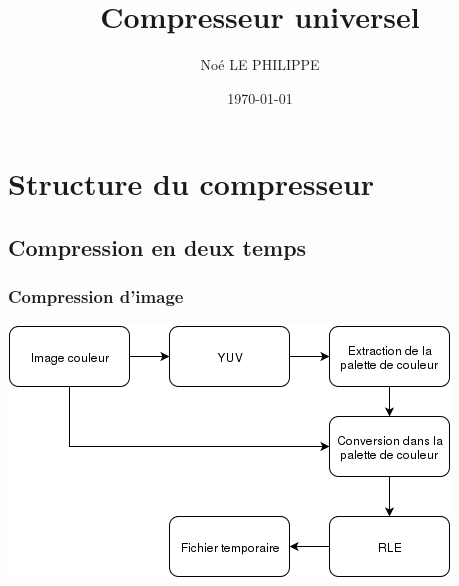 \documentclass{beamer}
\title{Compresseur universel}
\author{Noé LE PHILIPPE}
\institute{}
\date{\today}
\begin{document}
\begin{frame}
  \titlepage
\end{frame}

\section{Structure du compresseur}
\subsection{Compression en deux temps}
\begin{frame}
  \frametitle{Compression d'image}
  \includegraphics[scale=0.3]{image_compress.png}
  \pause
\end{frame}
\end{document}
